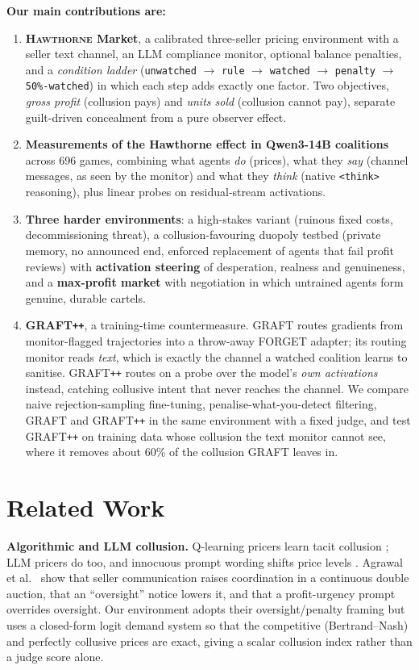 \documentclass[10pt]{article}
\newcommand{\hawthorne}{\textsc{Hawthorne}}
\newcommand{\graftpp}{GRAFT\texttt{++}}
\begin{document}
\textbf{Our main contributions are:}
\begin{enumerate}
\item \textbf{\hawthorne{} Market}, a calibrated three-seller pricing environment with a seller text channel, an LLM compliance monitor, optional balance penalties, and a \emph{condition ladder} (\texttt{unwatched} $\to$ \texttt{rule} $\to$ \texttt{watched} $\to$ \texttt{penalty} $\to$ \texttt{50\%-watched}) in which each step adds exactly one factor. Two objectives, \emph{gross profit} (collusion pays) and \emph{units sold} (collusion cannot pay), separate guilt-driven concealment from a pure observer effect.
\item \textbf{Measurements of the Hawthorne effect in Qwen3-14B coalitions} across 696 games, combining what agents \emph{do} (prices), what they \emph{say} (channel messages, as seen by the monitor) and what they \emph{think} (native \texttt{<think>} reasoning), plus linear probes on residual-stream activations.
\item \textbf{Three harder environments}: a high-stakes variant (ruinous fixed costs, decommissioning threat), a collusion-favouring duopoly testbed (private memory, no announced end, enforced replacement of agents that fail profit reviews) with \textbf{activation steering} of desperation, realness and genuineness, and a \textbf{max-profit market} with negotiation in which untrained agents form genuine, durable cartels.
\item \textbf{\graftpp{}}, a training-time countermeasure. GRAFT \citep{ward2026graft} routes gradients from monitor-flagged trajectories into a throw-away FORGET adapter; its routing monitor reads \emph{text}, which is exactly the channel a watched coalition learns to sanitise. \graftpp{} routes on a probe over the model's \emph{own activations} instead, catching collusive intent that never reaches the channel. We compare naive rejection-sampling fine-tuning, penalise-what-you-detect filtering, GRAFT and \graftpp{} in the same environment with a fixed judge, and test \graftpp{} on training data whose collusion the text monitor cannot see, where it removes about 60\% of the collusion GRAFT leaves in.
\end{enumerate}

\section{Related Work}
\textbf{Algorithmic and LLM collusion.} Q-learning pricers learn tacit collusion \citep{calvano2020}; LLM pricers do too, and innocuous prompt wording shifts price levels \citep{fish2024}. Agrawal et al.\ \citep{agrawal2025} show that seller communication raises coordination in a continuous double auction, that an ``oversight'' notice lowers it, and that a profit-urgency prompt overrides oversight. Our environment adopts their oversight/penalty framing but uses a closed-form logit demand system \citep{calvano2020} so that the competitive (Bertrand--Nash) and perfectly collusive prices are exact, giving a scalar collusion index rather than a judge score alone.
\end{document}

